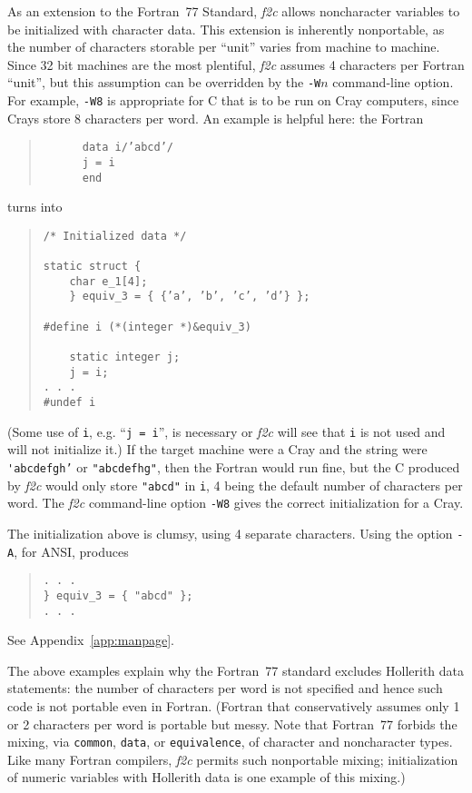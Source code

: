 \documentclass[10pt,a4paper]{article}
\begin{document}
As an extension to the Fortran~77 Standard, \emph{f2c} allows noncharacter variables to be initialized with character data. This extension is inherently nonportable, as the number of characters storable per ``unit'' varies from machine to machine. Since 32 bit machines are the most plentiful, \emph{f2c} assumes 4 characters per Fortran ``unit'', but this assumption can be overridden by the \verb|-W|$n$ command-line option. For example, \verb|-W8| is appropriate for C that is to be run on Cray computers, since Crays store 8 characters per word. An example is helpful here: the Fortran
\begin{quote}
\begin{verbatim}
      data i/’abcd’/
      j = i
      end
\end{verbatim}
\end{quote}
turns into
\begin{quote}
\begin{verbatim}
/* Initialized data */

static struct {
    char e_1[4];
    } equiv_3 = { {’a’, ’b’, ’c’, ’d’} };

#define i (*(integer *)&equiv_3)

    static integer j;
    j = i;
. . .
#undef i
\end{verbatim}
\end{quote}
(Some use of \verb|i|, e.g. ``\verb|j = i|'', is necessary or \emph{f2c} will see that \verb|i| is not used and will not initialize it.) If the target machine were a Cray and the string were \verb|'abcdefgh’| or \verb|"abcdefhg"|, then the Fortran would run fine, but the C produced by \emph{f2c} would only store \verb|"abcd"| in \verb|i|, 4 being the default number of characters per word. The \emph{f2c} command-line option \verb|-W8| gives the correct initialization for a Cray.

The initialization above is clumsy, using 4 separate characters. Using the option \verb|-A|, for ANSI, produces
\begin{quote}
\begin{verbatim}
. . .
} equiv_3 = { "abcd" };
. . .
\end{verbatim}
\end{quote}
See Appendix~\ref{app:manpage}.

The above examples explain why the Fortran~77 standard excludes Hollerith data statements: the number of characters per word is not specified and hence such code is not portable even in Fortran. (Fortran that conservatively assumes only 1 or 2 characters per word is portable but messy. Note that Fortran~77 forbids the mixing, via \verb|common|, \verb|data|, or \verb|equivalence|, of character and noncharacter types. Like many Fortran compilers, \emph{f2c} permits such nonportable mixing; initialization of numeric variables with Hollerith data is one example of this mixing.)
\end{document}
